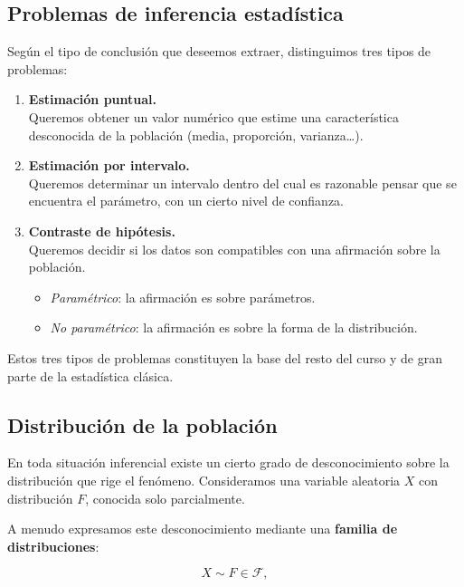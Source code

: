 \documentclass[
]{article}
\providecommand{\tightlist}{%
  \setlength{\itemsep}{0pt}\setlength{\parskip}{0pt}}
\begin{document}
\subsection{Problemas de inferencia estadística}\label{problemas-de-inferencia-estaduxedstica}

Según el tipo de conclusión que deseemos extraer, distinguimos tres tipos de problemas:

\begin{enumerate}
\def\labelenumi{\arabic{enumi}.}
\item
  \textbf{Estimación puntual.}\\
  Queremos obtener un valor numérico que estime una característica desconocida de la población (media, proporción, varianza\ldots).
\item
  \textbf{Estimación por intervalo.}\\
  Queremos determinar un intervalo dentro del cual es razonable pensar que se encuentra el parámetro, con un cierto nivel de confianza.
\item
  \textbf{Contraste de hipótesis.}\\
  Queremos decidir si los datos son compatibles con una afirmación sobre la población.

  \begin{itemize}
  \tightlist
  \item
    \emph{Paramétrico}: la afirmación es sobre parámetros.
  \item
    \emph{No paramétrico}: la afirmación es sobre la forma de la distribución.
  \end{itemize}
\end{enumerate}

Estos tres tipos de problemas constituyen la base del resto del curso y de gran parte de la estadística clásica.

\subsection{Distribución de la población}\label{distribuciuxf3n-de-la-poblaciuxf3n}

En toda situación inferencial existe un cierto grado de desconocimiento sobre la distribución que rige el fenómeno. Consideramos una variable aleatoria \(X\) con distribución \(F\), conocida solo parcialmente.

A menudo expresamos este desconocimiento mediante una \textbf{familia de distribuciones}:

\[
X \sim F \in \mathcal{F},
\]
\end{document}
